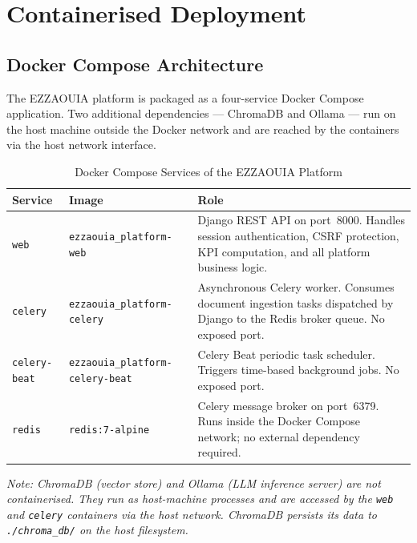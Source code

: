 \section{Containerised Deployment}
\begin{sloppypar}

\subsection{Docker Compose Architecture}

The EZZAOUIA platform is packaged as a four-service Docker Compose application.
Two additional dependencies --- ChromaDB and Ollama --- run on the host machine
outside the Docker network and are reached by the containers via the host
network interface.

\begin{table}[H]
\centering
\caption{Docker Compose Services of the EZZAOUIA Platform}
\label{tab:docker_services}
\renewcommand{\arraystretch}{1.5}
\begin{tabular}{|l|l|p{7cm}|}
\hline
\rowcolor{blue!20}
\textbf{Service} & \textbf{Image} & \textbf{Role} \\
\hline
\texttt{web} & \texttt{ezzaouia\_platform-web} &
  Django REST API on port~8000. Handles session authentication, CSRF
  protection, KPI computation, and all platform business logic. \\
\hline
\rowcolor{gray!10}
\texttt{celery} & \texttt{ezzaouia\_platform-celery} &
  Asynchronous Celery worker. Consumes document ingestion tasks
  dispatched by Django to the Redis broker queue. No exposed port. \\
\hline
\texttt{celery-beat} & \texttt{ezzaouia\_platform-celery-beat} &
  Celery Beat periodic task scheduler. Triggers time-based background
  jobs. No exposed port. \\
\hline
\rowcolor{gray!10}
\texttt{redis} & \texttt{redis:7-alpine} &
  Celery message broker on port~6379. Runs inside the Docker Compose
  network; no external dependency required. \\
\hline
\end{tabular}
\end{table}

\noindent\textit{Note: ChromaDB (vector store) and Ollama (LLM inference
server) are not containerised. They run as host-machine processes and are
accessed by the \texttt{web} and \texttt{celery} containers via the host
network. ChromaDB persists its data to \texttt{./chroma\_db/} on the host
filesystem.}


\end{sloppypar}
